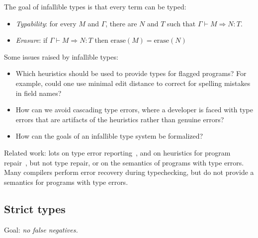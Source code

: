 \documentclass[acmsmall]{acmart}
\newcommand{\erase}{\mathrm{erase}}
\begin{document}
The goal of infallible types is that every term can be typed:
\begin{itemize}
\item \emph{Typability}: for every $M$ and $\Gamma$,
  there are $N$ and $T$ such that $\Gamma \vdash M \Rightarrow N : T$.
\item \emph{Erasure}: if $\Gamma \vdash M \Rightarrow N : T$
  then $\erase(M) = \erase(N)$ 
\end{itemize}
Some issues raised by infallible types:
\begin{itemize}
\item Which heuristics should be used to provide types for flagged programs? For example, could one
  use minimal edit distance to correct for spelling mistakes in field names?
\item How can we avoid cascading type errors, where a developer is
  faced with type errors that are artifacts of the heuristics rather
  than genuine errors?
\item How can the goals of an infallible type system be formalized?
\end{itemize}
Related work: lots on type error reporting~\cite{???}, and on
heuristics for program repair~\cite{???}, but not type repair, or on
the semantics of programs with type errors. Many compilers perform
error recovery during typechecking, but do not provide a semantics
for programs with type errors.

\subsection{Strict types}

Goal: \emph{no false negatives.}
\end{document}
